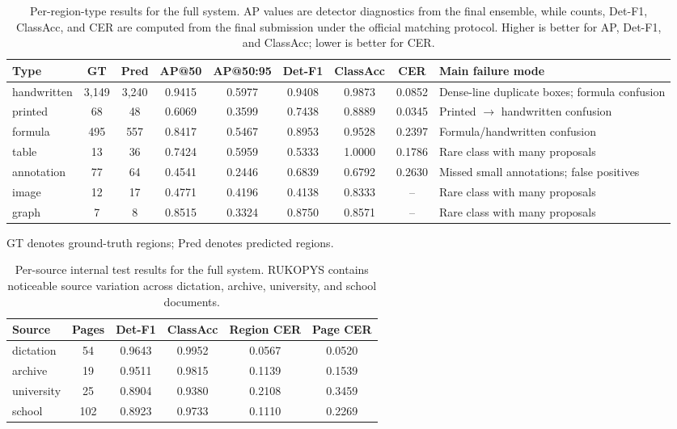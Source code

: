 \documentclass[runningheads]{llncs}
\newcommand{\metrichead}[1]{#1}
\newcommand{\tablenote}[1]{\vspace{2pt}\par\raggedright\scriptsize #1\par}
\begin{document}
\begin{table}[tb]
  \caption{Per-region-type results for the full system. AP values are detector diagnostics from the final ensemble, while counts, Det-F1, ClassAcc, and CER are computed from the final submission under the official matching protocol. Higher is better for AP, Det-F1, and ClassAcc; lower is better for CER.}
  \label{tab:per-type-results}
  \centering
  \begingroup
  \scriptsize
  \setlength{\tabcolsep}{2pt}
  \renewcommand{\arraystretch}{1.05}
  \begin{tabularx}{\linewidth}{@{}lcccccccY@{}}
    \toprule
    Type & \metrichead{GT} & \metrichead{Pred} & \metrichead{AP@50} & \metrichead{AP@50:95} & \metrichead{Det-F1} & \metrichead{ClassAcc} & \metrichead{CER} & Main failure mode \\
    \midrule
    handwritten & 3,149 & 3,240 & 0.9415 & 0.5977 & 0.9408 & 0.9873 & 0.0852 & Dense-line duplicate boxes; formula confusion \\
    printed & 68 & 48 & 0.6069 & 0.3599 & 0.7438 & 0.8889 & 0.0345 & Printed $\rightarrow$ handwritten confusion \\
    formula & 495 & 557 & 0.8417 & 0.5467 & 0.8953 & 0.9528 & 0.2397 & Formula/handwritten confusion \\
    table & 13 & 36 & 0.7424 & 0.5959 & 0.5333 & 1.0000 & 0.1786 & Rare class with many proposals \\
    annotation & 77 & 64 & 0.4541 & 0.2446 & 0.6839 & 0.6792 & 0.2630 & Missed small annotations; false positives \\
    image & 12 & 17 & 0.4771 & 0.4196 & 0.4138 & 0.8333 & -- & Rare class with many proposals \\
    graph & 7 & 8 & 0.8515 & 0.3324 & 0.8750 & 0.8571 & -- & Rare class with many proposals \\
    \bottomrule
  \end{tabularx}
  \tablenote{GT denotes ground-truth regions; Pred denotes predicted regions.}
  \endgroup
\end{table}

\begin{table}[tb]
  \caption{Per-source internal test results for the full system. RUKOPYS contains noticeable source variation across dictation, archive, university, and school documents.}
  \label{tab:per-source-results}
  \centering
  \begingroup
  \footnotesize
  \setlength{\tabcolsep}{8pt}
  \renewcommand{\arraystretch}{1.05}
  \begin{tabularx}{\linewidth}{@{}Yccccc@{}}
    \toprule
    Source & Pages & \metrichead{Det-F1} & \metrichead{ClassAcc} & \metrichead{Region CER} & \metrichead{Page CER} \\
    \midrule
    dictation & 54 & 0.9643 & 0.9952 & 0.0567 & 0.0520 \\
    archive & 19 & 0.9511 & 0.9815 & 0.1139 & 0.1539 \\
    university & 25 & 0.8904 & 0.9380 & 0.2108 & 0.3459 \\
    school & 102 & 0.8923 & 0.9733 & 0.1110 & 0.2269 \\
    \bottomrule
  \end{tabularx}
  \endgroup
\end{table}
\end{document}
